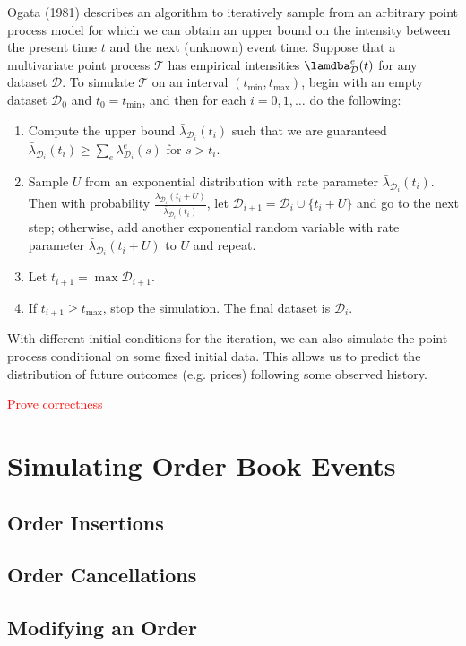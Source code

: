 \documentclass[honours,12pt]{unswthesis}
\numberwithin{equation}{section}
\begin{document}
Ogata (1981) \cite{Ogata} describes an algorithm to iteratively sample from an arbitrary point process model for which we can obtain an upper bound on the intensity between the present time $t$ and the next (unknown) event time. Suppose that a multivariate point process $\mathcal{T}$ has empirical intensities $\lamdba_\mathcal{D}^e(t)$ for any dataset $\mathcal{D}$. To simulate $\mathcal{T}$ on an interval $(t_\mathrm{min},t_\mathrm{max})$, begin with an empty dataset $\mathcal{D}_0$ and $t_0=t_\mathrm{min}$, and then for each $i=0,1,\ldots$ do the following:
\begin{enumerate}
	\item Compute the upper bound $\bar\lambda_{\mathcal{D}_i}(t_i)$ such that we are guaranteed $\bar\lambda_{\mathcal{D}_i}(t_i)\geq \sum_e \lambda_{\mathcal{D}_i}^e(s)$ for $s>t_i$.
	\item Sample $U$ from an exponential distribution with rate parameter $\bar\lambda_{\mathcal{D}_i}(t_i)$. Then with probability $\frac{\lambda_{\mathcal{D}_i}(t_i+U)}{\bar\lambda_{\mathcal{D}_i}(t_i)}$, let $\mathcal{D}_{i+1} = \mathcal{D}_i\cup\{t_i+U\}$ and go to the next step; otherwise, add another exponential random variable with rate parameter $\bar\lambda_{\mathcal{D}_i}(t_i+U)$ to $U$ and repeat.
	\item Let $t_{i+1}=\max \mathcal{D}_{i+1}$.
	\item If $t_{i+1}\geq t_\mathrm{max}$, stop the simulation. The final dataset is $\mathcal{D}_i$.
\end{enumerate}
With different initial conditions for the iteration, we can also simulate the point process conditional on some fixed initial data. This allows us to predict the distribution of future outcomes (e.g. prices) following some observed history.

\textcolor{red}{Prove correctness}

\section{Simulating Order Book Events}
\subsection{Order Insertions}
\subsection{Order Cancellations}
\subsection{Modifying an Order}
\end{document}
